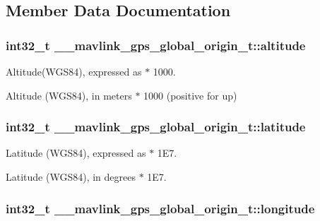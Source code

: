 \subsection{Member Data Documentation}
\hypertarget{struct____mavlink__gps__global__origin__t_a34577699f6c0ef2517eb8b16da733c15}{
\subsubsection[{altitude}]{\setlength{\rightskip}{0pt plus 5cm}int32\+\_\+t \+\_\+\+\_\+mavlink\+\_\+gps\+\_\+global\+\_\+origin\+\_\+t\+::altitude}}\label{struct____mavlink__gps__global__origin__t_a34577699f6c0ef2517eb8b16da733c15}


Altitude(\+W\+G\+S84), expressed as $\ast$ 1000. 

Altitude (W\+G\+S84), in meters $\ast$ 1000 (positive for up) \hypertarget{struct____mavlink__gps__global__origin__t_ab78807fb15062419bf5452c3294235bc}{
\subsubsection[{latitude}]{\setlength{\rightskip}{0pt plus 5cm}int32\+\_\+t \+\_\+\+\_\+mavlink\+\_\+gps\+\_\+global\+\_\+origin\+\_\+t\+::latitude}}\label{struct____mavlink__gps__global__origin__t_ab78807fb15062419bf5452c3294235bc}


Latitude (W\+G\+S84), expressed as $\ast$ 1\+E7. 

Latitude (W\+G\+S84), in degrees $\ast$ 1\+E7. \hypertarget{struct____mavlink__gps__global__origin__t_a52156dc446e0be0bc5cbf4247e194349}{
\subsubsection[{longitude}]{\setlength{\rightskip}{0pt plus 5cm}int32\+\_\+t \+\_\+\+\_\+mavlink\+\_\+gps\+\_\+global\+\_\+origin\+\_\+t\+::longitude}}\label{struct____mavlink__gps__global__origin__t_a52156dc446e0be0bc5cbf4247e194349}



